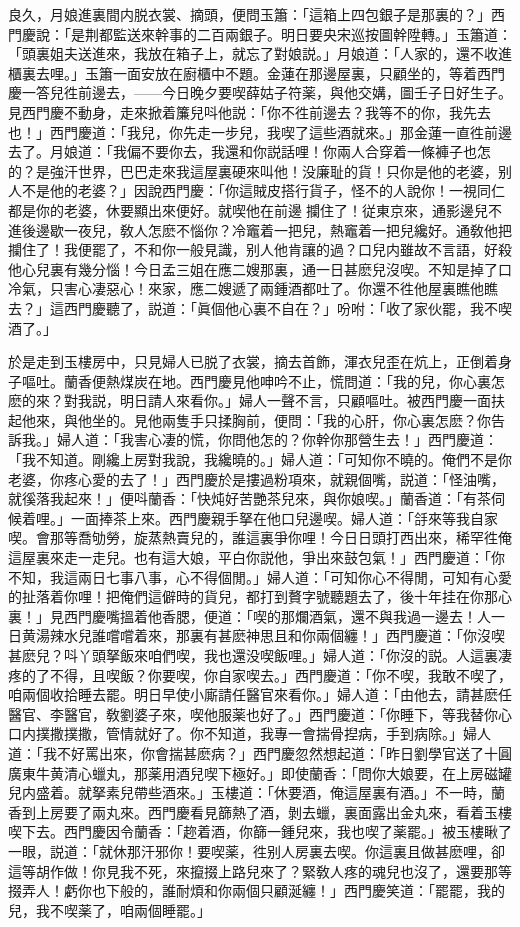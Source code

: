 良久，月娘進裏間内脱衣裳、摘頭，便問玉簫：「這箱上四包銀子是那裏的？」西門慶說：「是荆都監送來幹事的二百兩銀子。明日要央宋巡按圖幹陞轉。」玉簫道：「頭裏姐夫送進來，我放在箱子上，就忘了對娘説。」月娘道：「人家的，還不收進櫃裏去哩。」玉簫一面安放在廚櫃中不題。金蓮在那邊屋裏，只顧坐的，等着西門慶一答兒徃前邊去，——今日晚夕要喫薛姑子符薬，與他交媾，圖壬子日好生子。見西門慶不動身，走來掀着簾兒呌他説：「你不徃前邊去？我等不的你，我先去也！」西門慶道：「我兒，你先走一步兒，我喫了這些酒就來。」那金蓮一直徃前邊去了。月娘道：「我偏不要你去，我還和你説話哩！你兩人合穿着一條褲子也怎的？是強汗世界，巴巴走來我這屋裏硬來叫他！没廉耻的貨！只你是他的老婆，别人不是他的老婆？」因說西門慶：「你這賊皮搭行貨子，怪不的人說你！一視同仁都是你的老婆，休要顯出來便好。就喫他在前邊𢺞攔住了！従東京來，通影邊兒不進後邊歇一夜兒，敎人怎麽不惱你？冷竈着一把兒，熱竈着一把兒纔好。通敎他把攔住了！我便罷了，不和你一般見識，别人他肯讓的過？口兒内雖故不言語，好殺他心兒裏有幾分惱！今日孟三姐在應二嫂那裏，通一日甚麽兒沒喫。不知是掉了口冷氣，只害心凄惡心！來家，應二嫂遞了兩鍾酒都吐了。你還不徃他屋裏瞧他瞧去？」這西門慶聽了，説道：「眞個他心裏不自在？」吩咐：「收了家伙罷，我不喫酒了。」

於是走到玉樓房中，只見婦人已脱了衣裳，摘去首飾，渾衣兒歪在炕上，正倒着身子嘔吐。蘭香便熱煤炭在地。西門慶見他呻吟不止，慌問道：「我的兒，你心裏怎麽的來？對我説，明日請人來看你。」婦人一聲不言，只顧嘔吐。被西門慶一面扶起他來，與他坐的。見他兩隻手只揉胸前，便問：「我的心肝，你心裏怎麽？你告訴我。」婦人道：「我害心凄的慌，你問他怎的？你幹你那營生去！」西門慶道：「我不知道。剛纔上房對我說，我纔曉的。」婦人道：「可知你不曉的。俺們不是你老婆，你疼心愛的去了！」西門慶於是摟過粉項來，就親個嘴，説道：「怪油嘴，就徯落我起來！」便呌蘭香：「快炖好苦艷茶兒來，與你娘喫。」蘭香道：「有茶伺候着哩。」一面捧茶上來。西門慶親手拏在他口兒邊喫。婦人道：「㧱來等我自家喫。會那等喬劬勞，旋蒸熱賣兒的，誰這裏爭你哩！今日日頭打西出來，稀罕徃俺這屋裏來走一走兒。也有這大娘，平白你説他，爭出來鼓包氣！」西門慶道：「你不知，我這兩日七事八事，心不得個閒。」婦人道：「可知你心不得閒，可知有心愛的扯落着你哩！把俺們這僻時的貨兒，都打到贅字號聽題去了，後十年挂在你那心裏！」見西門慶嘴搵着他香腮，便道：「喫的那爛酒氣，還不與我過一邊去！人一日黄湯辣水兒誰嚐嚐着來，那裏有甚麽神思且和你兩個纏！」西門慶道：「你沒喫甚麽兒？呌丫頭拏飯來咱們喫，我也還没喫飯哩。」婦人道：「你沒的説。人這裏凄疼的了不得，且喫飯？你要喫，你自家喫去。」西門慶道：「你不喫，我敢不喫了，咱兩個收拾睡去罷。明日早使小廝請任醫官來看你。」婦人道：「由他去，請甚麽任醫官、李醫官，敎劉婆子來，喫他服薬也好了。」西門慶道：「你睡下，等我替你心口内撲撒撲撒，管情就好了。你不知道，我專一會揣骨揑病，手到病除。」婦人道：「我不好罵出來，你會揣甚麽病？」西門慶忽然想起道：「昨日劉學官送了十圓廣東牛黄清心蠟丸，那薬用酒兒喫下極好。」即使蘭香：「問你大娘要，在上房磁罐兒内盛着。就拏素兒帶些酒來。」玉樓道：「休要酒，俺這屋裏有酒。」不一時，蘭香到上房要了兩丸來。西門慶看見篩熱了酒，剝去蠟，裏面露出金丸來，看着玉樓喫下去。西門慶因令蘭香：「趂着酒，你篩一鍾兒來，我也喫了薬罷。」被玉樓瞅了一眼，説道：「就休那汗邪你！要喫薬，徃别人房裏去喫。你這裏且做甚麽哩，卻這等胡作做！你見我不死，來攛掇上路兒來了？緊敎人疼的魂兒也沒了，還要那等掇弄人！虧你也下般的，誰耐煩和你兩個只顧涎纏！」西門慶笑道：「罷罷，我的兒，我不喫薬了，咱兩個睡罷。」

